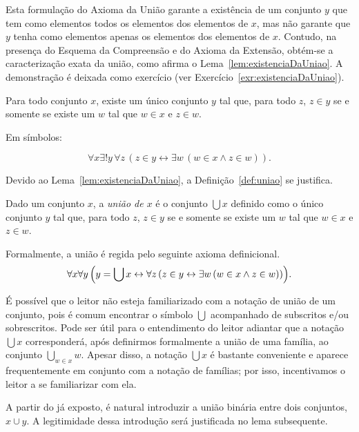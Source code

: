 Esta formulação do Axioma da União garante a existência de um conjunto $y$ que tem como elementos todos os elementos dos elementos de $x$, mas não garante que $y$ tenha como elementos apenas os elementos dos elementos de $x$.
Contudo, na presença do Esquema da Compreensão e do Axioma da Extensão, obtém-se a caracterização exata da união, como afirma o Lema~\ref{lem:existenciaDaUniao}.
A demonstração é deixada como exercício (ver Exercício~\ref{exr:existenciaDaUniao}).

\begin{lemma}[$\BST$]\label{lem:existenciaDaUniao}
    Para todo conjunto $x$, existe um único conjunto $y$ tal que, para todo $z$, $z \in y$ se e somente se existe um $w$ tal que $w \in x$ e $z \in w$.

    Em símbolos:

    \[
    \forall x \exists! y\, \forall z\, (z \in y \leftrightarrow \exists w\, (w \in x \land z \in w)).
    \]
\end{lemma}

Devido ao Lema~\ref{lem:existenciaDaUniao}, a Definição~\ref{def:uniao} se justifica.

\begin{definition}[$\BST$]\label{def:uniao}
    Dado um conjunto $x$, a \emph{união de $x$} é o conjunto $\bigcup x$ definido como o único conjunto $y$ tal que, para todo $z$, $z \in y$ se e somente se existe um $w$ tal que $w \in x$ e $z \in w$.
    
    Formalmente, a união é regida pelo seguinte axioma definicional.
    \[
    \forall x \forall y\, \Bigl(y = \bigcup x \leftrightarrow \forall z\, (z \in y \leftrightarrow \exists w\, (w \in x \land z \in w))\Bigr).
    \]
\end{definition}

É possível que o leitor não esteja familiarizado com a notação de união de um conjunto, pois é comum encontrar o símbolo $\bigcup$ acompanhado de subscritos e/ou sobrescritos.
Pode ser útil para o entendimento do leitor adiantar que a notação $\bigcup x$ corresponderá, após definirmos formalmente a união de uma família, ao conjunto $\bigcup_{w \in x} w$.
Apesar disso, a notação $\bigcup x$ é bastante conveniente e aparece frequentemente em conjunto com a notação de famílias; por isso, incentivamos o leitor a se familiarizar com ela.

A partir do já exposto, é natural introduzir a união binária entre dois conjuntos, $x\cup y$.
A legitimidade dessa introdução será justificada no lema subsequente.

